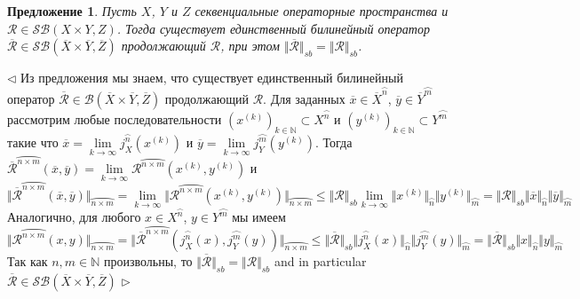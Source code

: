 \documentclass[12pt]{article}
\newtheorem{proposition}[theorem]{Предложение}
\newenvironment{proof}{\par $\triangleleft$}{$\triangleright$}
\begin{document}
\begin{proposition}\label{PrExtBilOpByCont} Пусть $X$, $Y$ и $Z$ секвенциальные операторные пространства и $\mathcal{R}\in\mathcal{SB}(X\times Y,Z)$. Тогда существует единственный билинейный оператор $\overline{\mathcal{R}}\in\mathcal{SB}(\overline{X}\times\overline{Y},\overline{Z})$ продолжающий $\mathcal{R}$, при этом $\Vert\overline{\mathcal{R}}\Vert_{sb}=\Vert\mathcal{R}\Vert_{sb}$.
\end{proposition}
\begin{proof} Из предложения \cite{DefFloTensNorOpId} мы знаем, что существует единственный билинейный оператор $\overline{\mathcal{R}}\in\mathcal{B}(\overline{X}\times\overline{Y},\overline{Z})$ продолжающий $\mathcal{R}$. Для заданных $\overline{x}\in \overline{X}^{\wideparen{n}}$, $\overline{y}\in \overline{Y}^{\wideparen{m}}$ рассмотрим любые последовательности $(x^{(k)})_{k\in\mathbb{N}}\subset X^{\wideparen{n}}$ и $(y^{(k)})_{k\in\mathbb{N}}\subset Y^{\wideparen{m}}$ такие что $\overline{x}=\lim\limits_{k\to\infty} j_X^{\wideparen{n}}(x^{(k)})$ и $\overline{y}=\lim\limits_{k\to\infty} j_Y^{\wideparen{m}}(y^{(k)})$. Тогда $\overline{\mathcal{R}}^{\wideparen{n\times m}}(\overline{x},\overline{y})=\lim\limits_{k\to\infty}\mathcal{R}^{\wideparen{n\times m}}(x^{(k)}, y^{(k)})$ и
$$
\Vert\overline{\mathcal{R}}^{\wideparen{n\times m}}(\overline{x},\overline{y})\Vert_{\wideparen{n\times m}}
=\lim\limits_{k\to\infty}\Vert \mathcal{R}^{\wideparen{n\times m}}(x^{(k)}, y^{(k)})\Vert_{\wideparen{n\times m}}
\leq\Vert\mathcal{R}\Vert_{sb}\lim\limits_{k\to\infty}\Vert x^{(k)}\Vert_{\wideparen{n}}\Vert y^{(k)}\Vert_{\wideparen{m}}
=\Vert\mathcal{R}\Vert_{sb}\Vert\overline{x}\Vert_{\wideparen{n}}\Vert \overline{y}\Vert_{\wideparen{m}}
$$
Аналогично, для любого $x\in X^{\wideparen{n}}$, $y\in Y^{\wideparen{m}}$ мы имеем
$$
\Vert\mathcal{R}^{\wideparen{n\times m}}(x,y)\Vert_{\wideparen{n\times m}}
=\Vert\overline{\mathcal{R}}^{\wideparen{n\times m}}(j_X^{\wideparen{n}}(x),j_Y^{\wideparen{m}}(y))\Vert_{\wideparen{n\times m}}
\leq\Vert\overline{\mathcal{R}}\Vert_{sb}\Vert j_X^{\wideparen{n}}(x)\Vert_{\wideparen{n}}\Vert j_Y^{\wideparen{m}}(y)\Vert_{\wideparen{m}}
=\Vert\overline{\mathcal{R}}\Vert_{sb}\Vert x\Vert_{\wideparen{n}}\Vert y\Vert_{\wideparen{m}}
$$
Так как $n,m\in\mathbb{N}$ произвольны, то $\Vert\overline{\mathcal{R}}\Vert_{sb}=\Vert\mathcal{R}\Vert_{sb}$ and in particular $\overline{\mathcal{R}}\in\mathcal{SB}(\overline{X}\times\overline{Y},\overline{Z})$
\end{proof}
\end{document}
